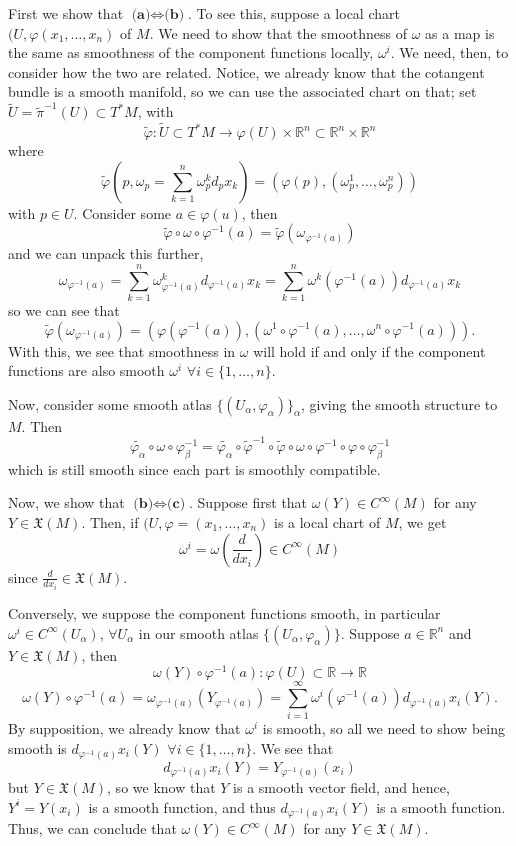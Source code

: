\documentclass[10pt]{article}
\newcommand{\R}{\mathbb{R}}
\newcommand{\del}[2][]{\frac{d #1}{d #2}}
\begin{document}
First we show that $\textbf{(a)}\iff\textbf{(b)}$. To see this, suppose a local chart $(U,\varphi(x_{1},\dots,x_{n})$ of $M$. We need to show that the smoothness of $\omega$ as a map is the same as smoothness of the component functions locally, $\omega^{i}$. We need, then, to consider how the two are related. Notice, we already know that the cotangent bundle is a smooth manifold, so we can use the associated chart on that; set $\tilde{U} = \tilde{\pi}^{-1}(U)\subset T^{*}M$, with 
\[ \tilde{\varphi}: \tilde{U}\subset T^{*}M \to \varphi(U)\times \R^{n} \subset \R^{n}\times\R^{n} \]
where
\[\tilde{\varphi}(p, \omega_{p} = \sum_{k=1}^{n}\omega_{p}^{k}d_{p}x_{k}) = (\varphi(p),(\omega_{p}^{1},\dots,\omega_{p}^{n}))\]
with $p\in U$. Consider some $a\in \varphi(u)$, then
\[ \tilde{\varphi}\circ\omega\circ \varphi^{-1}(a) = \tilde{\varphi}(\omega_{\varphi^{-1}(a)}) \]
and we can unpack this further,
\[ \omega_{\varphi^{-1}(a)} = \sum_{k=1}^{n} \omega_{\varphi^{-1}(a)}^{k}d_{\varphi^{-1}(a)}x_{k} = \sum_{k=1}^{n} \omega^{k}(\varphi^{-1}(a))d_{\varphi^{-1}(a)}x_{k}\]
so we can see that
\[ \tilde{\varphi}(\omega_{\varphi^{-1}(a)}) = (\varphi(\varphi^{-1}(a)), (\omega^{1}\circ \varphi^{-1}(a), \dots, \omega^{n}\circ \varphi^{-1}(a))). \]
With this, we see that smoothness in $\omega$ will hold if and only if the component functions are also smooth $\omega^{i}$ $\forall i \in \{1,\dots,n\}$.

Now, consider some smooth atlas $\{(U_{\alpha},\varphi_{\alpha})\}_{\alpha}$, giving the smooth structure to $M$. Then
\[ \tilde{\varphi_{\alpha}}\circ \omega \circ \varphi_{\beta}^{-1} = \tilde{\varphi_{\alpha}}\circ \tilde{\varphi}^{-1}\circ\tilde{\varphi}\circ\omega \circ\varphi^{-1}\circ\varphi\circ \varphi_{\beta}^{-1}\]
which is still smooth since each part is smoothly compatible.

Now, we show that $\textbf{(b)}\iff\textbf{(c)}$. Suppose first that $\omega(Y)\in C^{\infty}(M)$ for any $Y\in \mathfrak{X}(M)$. Then, if $(U,\varphi = (x_{1},\dots,x_{n})$ is a local chart of $M$, we get
\[ \omega^{i} = \omega\left(\del{x_{i}}\right) \in C^{\infty}(M) \]
since $\del{x_{i}}\in \mathfrak{X}(M)$.

Conversely, we suppose the component functions smooth, in particular $\omega^{i}\in C^{\infty}(U_{\alpha})$, $\forall U_{\alpha}$ in our smooth atlas $\{(U_{\alpha},\varphi_{\alpha})\}$. Suppose $a\in \R^{n}$ and $Y\in \mathfrak{X}(M)$, then
\[ \omega(Y) \circ \varphi^{-1}(a) : \varphi(U)\subset \R \to \R \]
\[ \omega(Y) \circ \varphi^{-1}(a) = \omega_{\varphi^{-1}(a)}(Y_{\varphi^{-1}(a)}) = \sum_{i=1}^{\infty}\omega^{i}(\varphi^{-1}(a))d_{\varphi^{-1}(a)}x_{i}(Y).\]
By supposition, we already know that $\omega^{i}$ is smooth, so all we need to show being smooth is $d_{\varphi^{-1}(a)}x_{i}(Y)$ $\forall i\in \{1,\dots,n\}$. We see that
\[ d_{\varphi^{-1}(a)}x_{i}(Y) = Y_{\varphi^{-1}(a)}(x_{i})\]
but $Y \in \mathfrak{X}(M)$, so we know that $Y$ is a smooth vector field, and hence, $Y^{i} = Y(x_{i})$ is a smooth function, and thus $d_{\varphi^{-1}(a)}x_{i}(Y)$ is a smooth function. Thus, we can conclude that $\omega(Y)\in C^{\infty}(M)$ for any $Y\in \mathfrak{X}(M)$.
\end{document}
